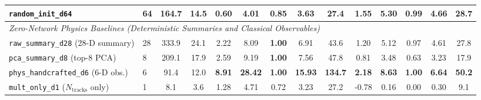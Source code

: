 \documentclass{article}
\begin{document}
\begin{table}[htbp]
{\begin{tabular}{llcc|ccccc|ccccc}
\texttt{random\_init\_d64} & 64 & 164.7 & 14.5 & 0.60 & 4.01 & 0.85 & 3.63 & 27.4 & 1.55 & 5.30 & 0.99 & 4.66 & 28.7 \\
\midrule
\multicolumn{14}{l}{\textit{Zero-Network Physics Baselines (Deterministic Summaries and Classical Observables)}} \\
\texttt{raw\_summary\_d28} (28-D summary) & 28 & 333.9 & 24.1 & 2.22 & 8.09 & \textbf{1.00} & 6.91 & 43.6 & 1.20 & 5.12 & 0.97 & 4.61 & 27.8 \\
\texttt{pca\_summary\_d8} (top-8 PCA) & 8 & 209.1 & 17.9 & 2.59 & 9.19 & \textbf{1.00} & 7.56 & 47.8 & 0.81 & 3.48 & 0.63 & 3.23 & 17.9 \\
\texttt{phys\_handcrafted\_d6} (6-D obs.) & 6 & 91.4 & 12.0 & \textbf{8.91} & \textbf{28.42} & \textbf{1.00} & \textbf{15.93} & \textbf{134.7} & \textbf{2.18} & \textbf{8.63} & \textbf{1.00} & \textbf{6.64} & \textbf{50.2} \\
\texttt{mult\_only\_d1} ($N_{\text{tracks}}$ only) & 1 & 8.1 & 3.6 & 1.28 & 4.71 & 0.72 & 3.23 & 27.2 & -0.78 & 0.16 & 0.00 & 0.30 & 9.1 \\
\bottomrule
\end{tabular}%
}
\end{table}

\begin{table}[htbp]
\centering
\caption{Supervised binary linear probe ROC-tail recall at held-out SM $\text{FPR} \in \{10^{-1}, 10^{-3}, 10^{-4}\}$ ($702,000$ SM test events) versus $1\%$ Higgs Portal Kernel NPLM $\text{SNR}$ ($250$-null protocol) across kernel centres, bandwidth quantiles, and shrinkage ZCA whitening.}
\label{tab:roc_tail}
\end{table}
\end{document}
